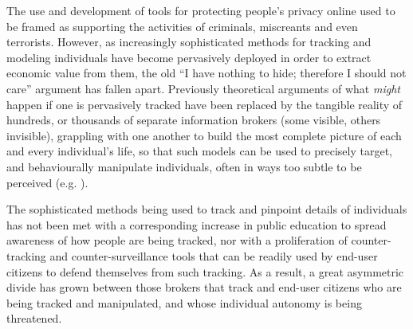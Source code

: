 \documentclass{IOS-Book-Article}     %
\begin{document}
The use and development of tools for protecting people's privacy online used to
be framed as supporting the activities of criminals, miscreants and even terrorists.  
However, as increasingly sophisticated methods for tracking and modeling individuals
have become pervasively deployed in order to extract economic value from them, 
the old ``I have nothing to hide; therefore I should not care'' argument has fallen apart. 
Previously theoretical arguments of what \emph{might} happen if one is pervasively tracked have been replaced by the tangible reality of hundreds, or thousands of separate information brokers 
(some visible, others invisible), grappling with one another to build the most 
complete picture of each and every individual's life, so that such models 
can be used to precisely target, and behaviourally manipulate individuals,
often in ways too subtle to be perceived (e.g. \cite{Kramer17062014}). 

The sophisticated methods being used to track and pinpoint details of individuals 
has not been met with a corresponding increase in public education to spread awareness
of how people are being tracked, nor with a proliferation of counter-tracking and 
counter-surveillance tools that can be readily used by end-user citizens to defend 
themselves from such tracking.  As a result, a great asymmetric divide has grown between 
those brokers that track and end-user citizens who are being tracked and manipulated, 
and whose individual autonomy is being threatened.  

% 


\end{document}
